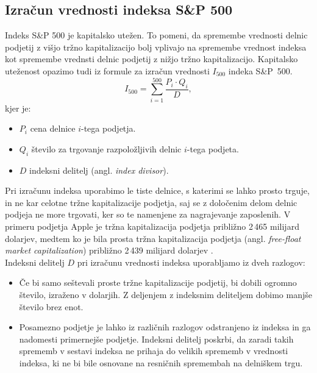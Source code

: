\documentclass[12pt,a4paper, reqno]{amsart}
\theoremstyle{definition} %
\theoremstyle{plain} %
\begin{document}
\subsection{Izračun vrednosti indeksa S\&P 500}
Indeks S\&P 500 je kapitalsko utežen. To pomeni, da spremembe vrednosti delnic podjetij z višjo tržno kapitalizacijo bolj vplivajo na spremembe vrednost indeksa kot spremembe vrednsti delnic podjetij z nižjo tržno kapitalizacijo. Kapitalsko uteženost opazimo tudi iz formule za izračun vrednosti $I_{500}$ indeka S\&P~500.
$$
I_{500} = \sum_{i=1}^{500}\frac{P_i \cdot{} Q_i}{D},
$$
kjer je:
\begin{itemize}
\item $P_i$ cena delnice $i$-tega podjetja.\\

\item $Q_i$ število za trgovanje razpoložljivih delnic $i$-tega podjeta.\\

\item $D$ indeksni delitelj (angl. \textit{index divisor}).\\
\end{itemize}

Pri izračunu indeksa uporabimo le tiste delnice, s katerimi se lahko prosto trguje, in ne kar celotne tržne kapitalizacije podjetja, saj se z določenim delom delnic podjeja ne more trgovati, ker so te namenjene za nagrajevanje zaposlenih. V primeru podjetja Apple je tržna kapitalizacija podjetja približno 2\,465 milijard dolarjev, medtem ko je bila prosta tržna kapitalizacija podjetja (angl. \textit{free-float market capitalization}) približno 2\,439 milijard dolarjev \cite{apple_capitalization}.\\
Indeksni delitelj $D$ pri izračunu vrednosti indeksa uporabljamo iz dveh razlogov:
\begin{itemize}
\item Če bi samo seštevali proste tržne kapitalizacije podjetij, bi dobili ogromno število, izraženo v dolarjih. Z deljenjem z indeksnim deliteljem dobimo manjše število brez enot.\\

\item Posamezno podjetje je lahko iz različnih razlogov odstranjeno iz indeksa in ga nadomesti primernejše podjetje. Indeksni delitelj poskrbi, da zaradi takih sprememb v sestavi indeksa ne prihaja do velikih sprememb v vrednosti indeksa, ki ne bi bile osnovane na resničnih spremembah na delniškem trgu.\\
\end{itemize}
\end{document}
